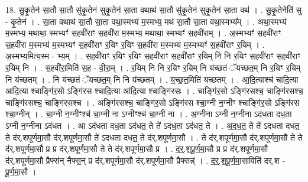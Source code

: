 \documentclass[17pt]{extarticle}
\begin{document}
18. सु॒कृ॒तेन॑ सा॒तौ सा॒तौ सु॑कृ॒तेन॑ सुकृ॒तेन॑ सा॒ता वथाथ॑ सा॒तौ सु॑कृ॒तेन॑ सुकृ॒तेन॑ सा॒ता वथ॑ । . सु॒कृ॒तेनेति॑ सु - कृ॒तेन॑ । . सा॒ता वथाथ॑ सा॒तौ सा॒ता वथा॒स्मभ्य॑ म॒स्मभ्य॒ मथ॑ सा॒तौ सा॒ता वथा॒स्मभ्य᳚म् । . अथा॒स्मभ्य॑ म॒स्मभ्य॒ मथाथा॒ स्मभ्यꣳ॑ स॒हवी॑राꣳ स॒हवी॑रा म॒स्मभ्य॒ मथाथा॒ स्मभ्यꣳ॑ स॒हवी॑राम् । . अ॒स्मभ्यꣳ॑ स॒हवी॑राꣳ स॒हवी॑रा म॒स्मभ्य॑ म॒स्मभ्यꣳ॑ स॒हवी॑राꣳ र॒यिꣳ र॒यिꣳ स॒हवी॑रा म॒स्मभ्य॑ म॒स्मभ्यꣳ॑ स॒हवी॑राꣳ र॒यिम् । . अ॒स्मभ्य॒मित्य॒स्म - भ्य॒म् । . स॒हवी॑राꣳ र॒यिꣳ र॒यिꣳ स॒हवी॑राꣳ स॒हवी॑राꣳ र॒यिम् नि नि र॒यिꣳ स॒हवी॑राꣳ स॒हवी॑राꣳ र॒यिम् नि । . स॒हवी॑रा॒मिति॑ स॒ह - वी॒रा॒म् । . र॒यिम् नि नि र॒यिꣳ र॒यिम् नि य॑च्छतं ॅयच्छत॒म् नि र॒यिꣳ र॒यिम् नि य॑च्छतम् । . नि य॑च्छतं ॅयच्छत॒म् नि नि य॑च्छतम् । . य॒च्छ॒त॒मिति॑ यच्छतम् । . आ॒दि॒त्याश्च॑ चादि॒त्या आ॑दि॒त्या श्चाङ्गि॑र॒सो ऽङ्गि॑रस श्चादि॒त्या आ॑दि॒त्या श्चाङ्गि॑रसः । . चाङ्गि॑र॒सो ऽङ्गि॑रसश्च॒ चाङ्गि॑रसश्च॒ चाङ्गि॑रसश्च॒ चाङ्गि॑रसश्च । . अङ्गि॑रसश्च॒ चाङ्गि॑र॒सो ऽङ्गि॑रस श्चा॒ग्नी न॒ग्नीꣳ श्चाङ्गि॑र॒सो ऽङ्गि॑रस श्चा॒ग्नीन् । . चा॒ग्नी न॒ग्नीꣳश्च॑ चा॒ग्नी ना ऽग्नीꣳश्च॑ चा॒ग्नी ना । . अ॒ग्नीना ऽग्नी न॒ग्नीना ऽद॑धता दध॒ता ऽग्नी न॒ग्नीना ऽद॑धत । . आ ऽद॑धता दध॒ता ऽद॑धत॒ ते ते॑ ऽदध॒ता ऽद॑धत॒ ते । . अ॒द॒ध॒त॒ ते ते॑ ऽदधता दधत॒ ते द॑र्.शपूर्णमा॒सौ द॑र्.शपूर्णमा॒सौ ते॑ ऽदधता दधत॒ ते द॑र्.शपूर्णमा॒सौ । . ते द॑र्.शपूर्णमा॒सौ द॑र्.शपूर्णमा॒सौ ते ते द॑र्.शपूर्णमा॒सौ प्र प्र द॑र्.शपूर्णमा॒सौ ते ते द॑र्.शपूर्णमा॒सौ प्र । . द॒र्॒.श॒पू॒र्ण॒मा॒सौ प्र प्र द॑र्.शपूर्णमा॒सौ द॑र्.शपूर्णमा॒सौ प्रैफ्स॑न् नैफ्स॒न् प्र द॑र्.शपूर्णमा॒सौ द॑र्.शपूर्णमा॒सौ प्रैफ्सन्न्॑ । . द॒र्॒.श॒पू॒र्ण॒मा॒साविति॑ दर्.श - पू॒र्ण॒मा॒सौ । \newline
\end{document}
